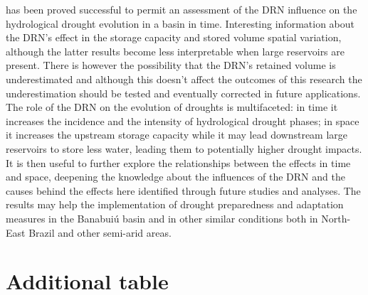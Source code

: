 \documentclass[draft]{agujournal2019}
\begin{document}
has been proved successful to permit an assessment of the DRN influence on the hydrological drought evolution in a basin in time. Interesting information about the DRN’s effect in the storage capacity and stored volume spatial variation, although the latter results become less interpretable when large reservoirs are present. There is however the possibility that the DRN’s retained volume is underestimated and although this doesn’t affect the outcomes of this research the underestimation should be tested and eventually corrected in future applications.\\
The role of the DRN on the evolution of droughts is multifaceted: in time it increases the incidence and the intensity of hydrological drought phases; in space it increases the upstream storage capacity while it may lead downstream large reservoirs to store less water, leading them to potentially higher drought impacts. It is then useful to further explore the relationships between the effects in time and space, deepening the knowledge about the influences of the DRN and the causes behind the effects here identified through future studies and analyses. The results may help the implementation of drought preparedness and adaptation measures in the Banabuiú basin and in other similar conditions both in North-East Brazil and other semi-arid areas.


%
%
%
%

\newpage
\appendix
\section{Additional table}
\end{document}

